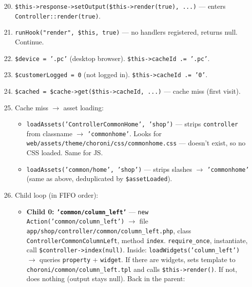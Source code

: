 \documentclass[11pt,a4paper]{article}
\begin{document}
\begin{enumerate}[leftmargin=1.6em,itemsep=2pt]
  \setcounter{enumi}{19}
  \item \texttt{\$this->response->setOutput(\$this->render(true),
        ...)} --- enters \texttt{Controller::render(true)}.
  \item \texttt{runHook("render", \$this, true)} --- no handlers
        registered, returns null. Continue.
  \item \texttt{\$device = '.pc'} (desktop browser).
        \texttt{\$this->cacheId .= '.pc'}.
  \item \texttt{\$customerLogged = 0} (not logged in).
        \texttt{\$this->cacheId .= '0'}.
  \item \texttt{\$cached = \$cache->get(\$this->cacheId, ...)}
        --- cache miss (first visit).
  \item Cache miss $\to$ asset loading:
        \begin{itemize}[itemsep=2pt]
          \item \texttt{loadAssets('ControllerCommonHome', 'shop')}
                --- strips \texttt{controller} from classname $\to$
                \texttt{'commonhome'}. Looks for
                \texttt{web/assets/theme/choroni/css/commonhome.css}
                --- doesn't exist, so no CSS loaded. Same for JS.
          \item \texttt{loadAssets('common/home', 'shop')} ---
                strips slashes $\to$ \texttt{'commonhome'} (same
                as above, deduplicated by \texttt{\$assetLoaded}).
        \end{itemize}
  \item Child loop (in FIFO order):
        \begin{itemize}[itemsep=2pt]
          \item \textbf{Child 0: \texttt{'common/column\_left'}}
                --- \texttt{new Action('common/column\_left')} $\to$
                file \texttt{app/shop/controller/common/column\_left.php},
                class \texttt{ControllerCommonColumnLeft}, method
                \texttt{index}. \texttt{require\_once}, instantiate,
                call \texttt{\$controller->index(null)}. Inside:
                \texttt{loadWidgets('column\_left')} $\to$ queries
                \texttt{property} + \texttt{widget}. If there are
                widgets, sets template to
                \texttt{choroni/common/column\_left.tpl} and calls
                \texttt{\$this->render()}. If not, does nothing
                (output stays null). Back in the parent:

\end{itemize}
\end{enumerate}
\end{document}
